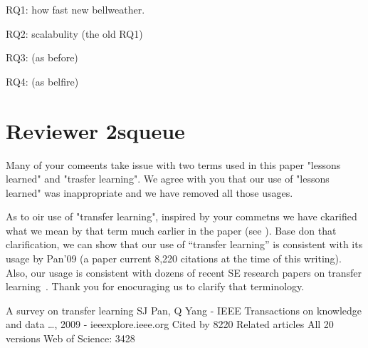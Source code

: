 RQ1: how fast new bellweather.

RQ2: scalabulity (the old RQ1)

RQ3: (as before)

RQ4: (as belfire)



\section*{Reviewer 2squeue}

Many of your comeents take issue with two terms used in this paper "lessons learned" and "trasfer learning".
We agree with you that our use of "lessons learned" was inappropriate and we have removed all those usages.

As to oir use of "transfer learning", 
inspired by your commetns we have ckarified what we mean by that term much earlier in the paper (see \cite{XXX}). Base don that clarification, we can show that our use of ``transfer learning'' is consistent with its usage by Pan'09 (a paper current 8,220 citations at the time of this writing). Also, our usage is consistent with dozens of recent SE research papers on transfer learning~\cite{XXXmanycite}. Thank you for enocuraging us to clarify that terminology.

A survey on transfer learning
SJ Pan, Q Yang - IEEE Transactions on knowledge and data …, 2009 - ieeexplore.ieee.org
  Cited by 8220 Related articles All 20 versions Web of Science: 3428
  






